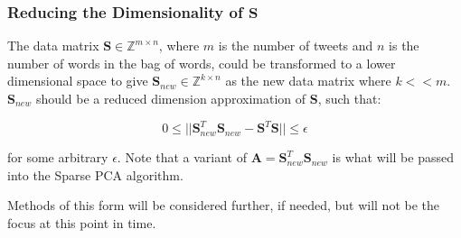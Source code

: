\documentclass[11pt,a4paper]{article}
\begin{document}
\subsubsection{Reducing the Dimensionality of $\mathbf{S}$}
The data matrix $\mathbf{S} \in \mathbb{Z}^{m \times n}$, where $m$ is the number of tweets and $n$ is the number of words in the bag of words, could be transformed to a lower dimensional space to give $\mathbf{S}_{new} \in \mathbb{Z}^{k \times n}$ as the new data matrix where $k << m$. $\mathbf{S}_{new}$ should be a reduced dimension approximation of  $\mathbf{S}$, such that:


\begin{equation*}
0 \le ||\mathbf{S}_{new}^T\mathbf{S}_{new} - \mathbf{S}^T\mathbf{S}|| \le \epsilon 
\end{equation*}

for some arbitrary $\epsilon$. Note that a variant of $\mathbf{A} = \mathbf{S}_{new}^T\mathbf{S}_{new}$ is what will be passed into the Sparse PCA algorithm. 

Methods of this form will be considered further, if needed, but will not be the focus at this point in time.




\end{document}
